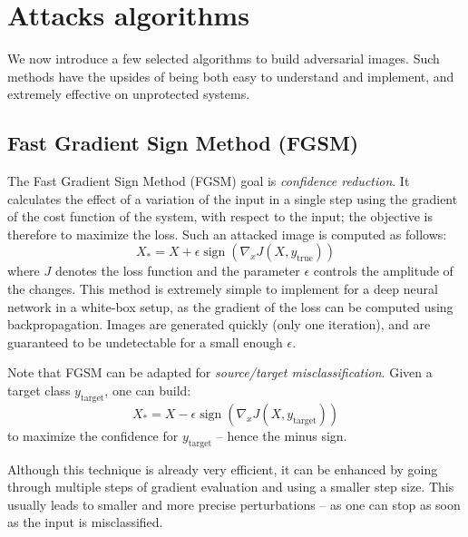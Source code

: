 \documentclass[twocolumn]{../../cs-classes/cs-classes}
\DeclareMathOperator*{\sign}{sign}
\begin{document}

\section{Attacks algorithms}
\label{sec:attacks-algorithms}
We now introduce a few selected algorithms to build adversarial images. Such methods have the upsides of being both easy to understand and implement, and extremely effective on unprotected systems.

\subsection{Fast Gradient Sign Method (FGSM)}
The Fast Gradient Sign Method (FGSM) goal is \emph{confidence reduction}. It calculates the effect of a variation of the input in a single step using the gradient of the cost function of the system, with respect to the input; the objective is therefore to maximize the loss. Such an attacked image is computed as follows:
\begin{equation*}
    X_* = X + \epsilon\sign\left(\nabla_x J(X, y_{\text{true}})\right)
\end{equation*}
where $J$ denotes the loss function and the parameter $\epsilon$ controls the amplitude of the changes.
This method is extremely simple to implement for a deep neural network in a white-box setup, as the gradient of the loss can be computed using backpropagation. Images are generated quickly (only one iteration), and are guaranteed to be undetectable for a small enough $\epsilon$.

Note that FGSM can be adapted for \emph{source/target misclassification}. Given a target class $y_{\text{target}}$, one can build:
\begin{equation*}
    X_* = X - \epsilon\sign\left(\nabla_x J(X, y_{\text{target}})\right)
\end{equation*}
to maximize the confidence for $y_{\text{target}}$ -- hence the minus sign.

Although this technique is already very efficient, it can be enhanced by going through multiple steps of gradient evaluation and using a smaller step size. This usually leads to smaller and more precise perturbations -- as one can stop as soon as the input is misclassified.
\end{document}
